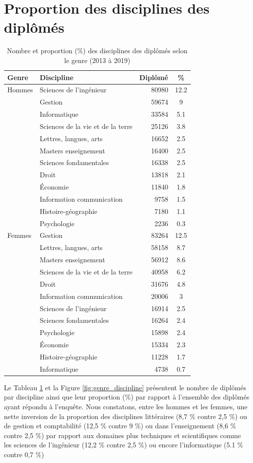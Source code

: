 \documentclass[12pt, a4paper, titlepage, table]{article}
\begin{document}
\section{Proportion des disciplines des diplômés}
	\begin{table}[H]
		\centering
		\begin{tabular}{llrc}
			\toprule
			\textbf{Genre} & \textbf{Discipline} & \textbf{Diplômé} & \textbf{\%} \\
			\midrule
			Hommes & Sciences de l'ingénieur & 80980 & 12.2 \\
			& Gestion & 59674 & 9 \\
			& Informatique & 33584 & 5.1 \\
			& Sciences de la vie et de la terre & 25126 & 3.8 \\
			& Lettres, langues, arts & 16652 & 2.5 \\
			& Masters enseignement & 16400 & 2.5 \\
			& Sciences fondamentales & 16338 & 2.5 \\
			& Droit & 13818 & 2.1 \\
			& Économie & 11840 & 1.8 \\
			& Information communication & 9758 & 1.5 \\
			& Histoire-géographie & 7180 & 1.1 \\
			& Psychologie & 2236 & 0.3 \\
			\midrule
			Femmes & Gestion & 83264 & 12.5 \\
			& Lettres, langues, arts & 58158 & 8.7 \\
			& Masters enseignement & 56912 & 8.6 \\
			& Sciences de la vie et de la terre & 40958 & 6.2 \\
			& Droit & 31676 & 4.8 \\
			& Information communication & 20006 & 3 \\
			& Sciences de l'ingénieur & 16914 & 2.5 \\
			& Sciences fondamentales & 16264 & 2.4 \\
			& Psychologie & 15898 & 2.4 \\
			& Économie & 15334 & 2.3 \\
			& Histoire-géographie & 11228 & 1.7 \\
			& Informatique & 4738 & 0.7 \\
			\bottomrule
		\end{tabular}
		\caption{Nombre et proportion (\%) des disciplines des diplômés selon le genre (2013 à 2019)}
		\label{tab:genre_discipline}
	\end{table}
	Le Tableau \ref{tab:genre_discipline} et la Figure \ref{fig:genre_discipline} présentent le nombre de diplômés par discipline ainsi que leur proportion (\%) par rapport à l'ensemble des diplômés ayant répondu à l'enquête.
	Nous constatons, entre les hommes et les femmes,  une nette inversion de la proportion des disciplines  littéraires (8,7 \% contre 2,5 \%) ou de gestion et comptabilité (12,5 \% contre 9 \%) ou dans l'enseignement (8,6 \% contre 2,5 \%) par rapport aux domaines plus techniques et scientifiques comme les sciences de l'ingénieur (12,2 \% contre 2,5 \%) ou encore l'informatique (5.1 \% contre 0,7 \%)
\end{document}
